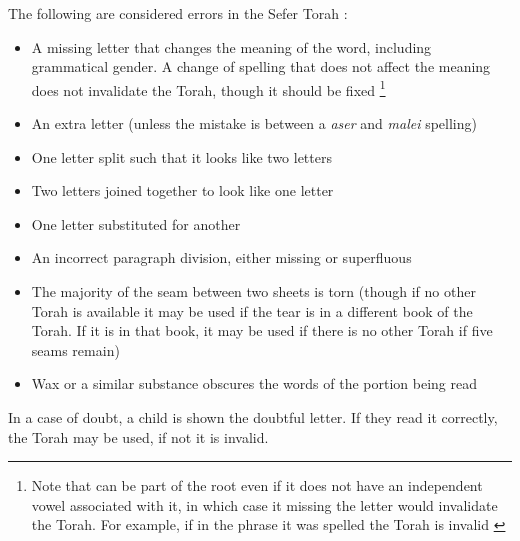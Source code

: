 

The following are considered errors in the Sefer Torah \parencite[24:1]{Kitzur}:
\begin{itemize}
	\item A missing letter that changes the meaning of the word, including grammatical gender. A change of spelling that does not affect the meaning does not invalidate the Torah, though it should be fixed \footnote{Note that can be part of the root even if it does not have an independent vowel associated with it, in which case it missing the letter would invalidate the Torah.  For example, if in the phrase  it was spelled  the Torah is invalid \parencite*[24:1]{Kitzur}}
	\item An extra letter (unless the mistake is between a \textit{\heth aser} and \textit{malei} spelling)
	\item One letter split such that it looks like two letters
	\item Two letters joined together to look like one letter
	\item One letter substituted for another
	\item An incorrect paragraph division, either missing or superfluous
	\item The majority of the seam between two sheets is torn (though if no other Torah is available it may be used if the tear is in a different book of the Torah.  If it is in that book, it may be used if there is no other Torah if five seams remain)
	\item Wax or a similar substance obscures the words of the portion being read
\end{itemize}

In a case of doubt, a child is shown the doubtful letter.  If they read it correctly, the Torah may be used, if not it is invalid.

